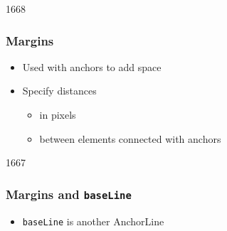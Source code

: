 \begin{slide}{1668}
\frametitle{Margins}

\begin{itemize}
\item Used with anchors to add space
\item Specify distances
  \begin{itemize}
  \item in pixels
  \item between elements connected with anchors
  \end{itemize}
\end{itemize}


\end{slide}


\begin{slide}{1667}
\frametitle{Margins and \texttt{baseLine}}
\begin{itemize}
\item \texttt{baseLine} is another AnchorLine
\end{itemize}

\end{slide}



